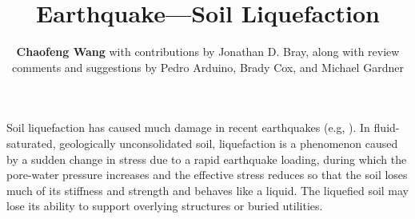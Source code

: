 %
%
%


%
%
%
%
%
%
%
%

\title{Earthquake---Soil Liquefaction}
\author{
    \textbf{Chaofeng Wang}
    with contributions by Jonathan D. Bray,
    \newline
    along with review comments and suggestions by Pedro Arduino, Brady Cox, and Michael Gardner
}
\tocauthor{}
%
%
\maketitle

Soil liquefaction has caused much damage in recent earthquakes (e.g, \cite{cubrinovski2011geotechnical, cubrinovski2017liquefaction, bray2017new}). In fluid-saturated, geologically unconsolidated soil, liquefaction is a phenomenon caused by a sudden change in stress due to a rapid earthquake loading, during which the pore-water pressure increases and the effective stress reduces so that the soil loses much of its stiffness and strength and behaves like a liquid. The liquefied soil may lose its ability to support overlying structures or buried utilities. 

